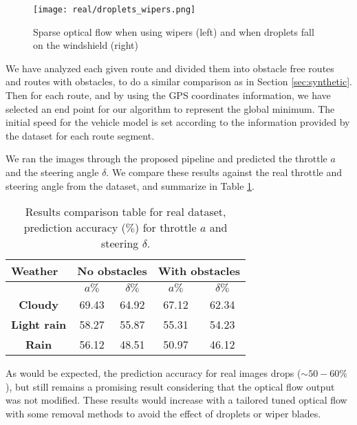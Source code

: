 \documentclass[letterpaper, 10 pt, conference]{ieeeconf}  %
\begin{document}
\begin{figure}[h!]
\texttt{[image: real/droplets\_wipers.png]}
\caption{Sparse optical flow when using wipers (left) and when droplets fall on the windshield (right)}
\label{fig:real}
\end{figure}

We have analyzed each given route and divided them into obstacle free routes and routes with obstacles, to do a similar comparison as in Section \ref{sec:synthetic}. Then for each route, and by using the GPS coordinates information, we have selected an end point for our algorithm to represent the global minimum. The initial speed for the vehicle model is set according to the information provided by the dataset for each route segment.

We ran the images through the proposed pipeline and predicted the throttle $a$ and the steering angle $\delta$. We compare these results against the real throttle and steering angle from the dataset, and summarize in Table \ref{tab:realres}.

\begin{table}[]
\centering
\caption{Results comparison table for real dataset, prediction accuracy ($\%$) for throttle $a$ and steering $\delta$.}
\label{tab:realres}
\begin{tabular}{c|cc|cc}
\hline
\multicolumn{1}{l|}{\textbf{Weather}} & \multicolumn{2}{c|}{\textbf{No obstacles}} & \multicolumn{2}{c}{\textbf{With obstacles}} \\ \hline
\textbf{} & \textbf{$a \%$} & \textbf{$\delta \%$} & \textbf{$a \%$} & \textbf{$\delta \%$} \\
\textbf{Cloudy} & 69.43 & 64.92 & 67.12 & 62.34 \\
\multicolumn{1}{l|}{\textbf{Light rain}} & 58.27 & 55.87 & 55.31 & 54.23 \\
\textbf{Rain} & 56.12 & 48.51 & 50.97 & 46.12 \\ \hline
\end{tabular}%
\end{table}

As would be expected, the prediction accuracy for real images drops ($\sim50 - 60\%$), but still remains a promising result considering that the optical flow output was not modified. These results would increase with a tailored tuned optical flow with some removal methods to avoid the effect of droplets or wiper blades. 
\end{document}
